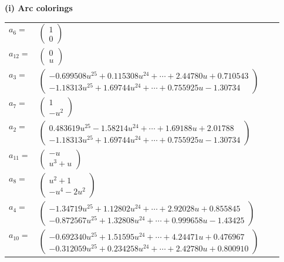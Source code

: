 \documentclass[1p]{elsarticle_modified}
\theoremstyle{definition}
\begin{document}
\flushleft \textbf{(i) Arc colorings}\\
\begin{tabular}{m{7pt} m{180pt} m{7pt} m{180pt} }
\flushright $a_{6}=$&$\begin{pmatrix}1\\0\end{pmatrix}$ \\
\flushright $a_{12}=$&$\begin{pmatrix}0\\u\end{pmatrix}$ \\
\flushright $a_{3}=$&$\begin{pmatrix}-0.699508 u^{25}+0.115308 u^{24}+\cdots+2.44780 u+0.710543\\-1.18313 u^{25}+1.69744 u^{24}+\cdots+0.755925 u-1.30734\end{pmatrix}$ \\
\flushright $a_{7}=$&$\begin{pmatrix}1\\- u^2\end{pmatrix}$ \\
\flushright $a_{2}=$&$\begin{pmatrix}0.483619 u^{25}-1.58214 u^{24}+\cdots+1.69188 u+2.01788\\-1.18313 u^{25}+1.69744 u^{24}+\cdots+0.755925 u-1.30734\end{pmatrix}$ \\
\flushright $a_{11}=$&$\begin{pmatrix}- u\\u^3+u\end{pmatrix}$ \\
\flushright $a_{8}=$&$\begin{pmatrix}u^2+1\\- u^4-2 u^2\end{pmatrix}$ \\
\flushright $a_{4}=$&$\begin{pmatrix}-1.34719 u^{25}+1.12802 u^{24}+\cdots+2.92028 u+0.855845\\-0.872567 u^{25}+1.32808 u^{24}+\cdots+0.999658 u-1.43425\end{pmatrix}$ \\
\flushright $a_{10}=$&$\begin{pmatrix}-0.692340 u^{25}+1.51595 u^{24}+\cdots+4.24471 u+0.476967\\-0.312059 u^{25}+0.234258 u^{24}+\cdots+2.42780 u+0.800910\end{pmatrix}$ \\

\end{tabular}
\end{document}
